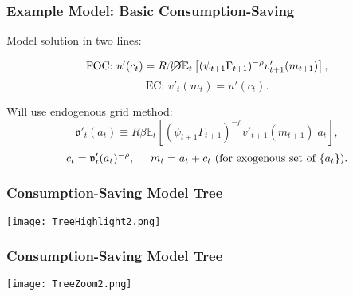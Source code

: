 \documentclass[11ptt]{beamer}
\newcommand{\E}{\mathbb{E}}
\newcommand{\Die}{\mathsf{D}}
\newcommand{\Live}{\cancel{\Die}}
\begin{document}
\begin{frame}
\frametitle{Example Model: Basic Consumption-Saving}

Model solution in two lines:

\begin{equation*}
\text{FOC: } u'(c_t) = R \beta \Live \E_t \left[(\psi_{t+1} \Gamma_{t+1})^{-\rho} v'_{t+1}(m_{t+1}) \right],
\end{equation*}
\begin{equation*}
\text{EC: } v'_t(m_t) = u'(c_t).
\end{equation*}

Will use endogenous grid method:
\begin{equation*}
\mathfrak{v}'_t(a_t) \equiv R \beta \E_t \left[(\psi_{t+1} \Gamma_{t+1})^{-\rho} v'_{t+1}(m_{t+1}) | a_t\right],
\end{equation*}
\begin{equation*}
c_t = \mathfrak{v}'_t(a_t)^{-\rho}, \hspace{0.5cm} m_t = a_t + c_t \text{ (for exogenous set of } \{a_t\} \text{)}.
\end{equation*}

\hyperlink{ModelStatement}{}
\end{frame}





\begin{frame}\label{Recombination}
\frametitle{Consumption-Saving Model Tree}
\begin{center}
\texttt{[image: TreeHighlight2.png]}
\end{center}
\end{frame}

\begin{frame}
\frametitle{Consumption-Saving Model Tree}
\begin{center}
\texttt{[image: TreeZoom2.png]}
\end{center}
\end{frame}
\end{document}
